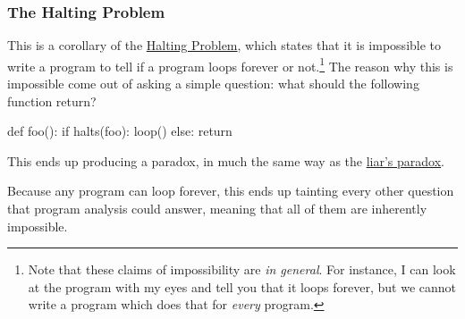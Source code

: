 \documentclass[aspectratio=169, handout]{beamer}
\begin{document}
\begin{frame}[fragile]
  \frametitle{The Halting Problem}

  This is a corollary of the
  {\color{blue}\href{https://en.wikipedia.org/wiki/Halting_problem}{Halting
  Problem}}, which states that it is impossible to write a program to tell if a
  program loops forever or not.\footnote{Note that these claims of impossibility
  are \textit{in general}. For instance, I can look at the program  with my eyes and tell you that it loops forever, but we cannot
  write a program which does that for \textit{every} program.} The reason why
  this is impossible come out of asking a simple question: what should the
  following function return?

  \pause
  \vspace{\fill}

  {\small
  \begin{codeblock}[language=python]
    def foo():
      if halts(foo):
        loop()
      else:
        return
  \end{codeblock}
  }

  \pause
  \vspace{\fill}

  This ends up producing a paradox, in much the same way as the
  {\color{blue}\href{https://en.wikipedia.org/wiki/Liar_paradox}{liar's paradox}}.

  \pause
  \vspace{\fill}

  Because any program can loop forever, this ends up tainting every other
  question that program analysis could answer, meaning that all of them are inherently
  impossible.
\end{frame}
\end{document}
